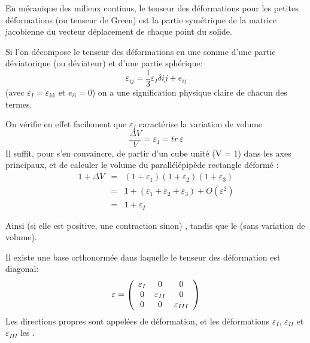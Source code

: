 \medskip
En mécanique des milieux continus, le tenseur des déformations pour les petites déformations 
(ou tenseur de Green) est la partie symétrique de la matrice jacobienne du vecteur déplacement 
de chaque point du solide.

\medskip
Si l'on décompose le tenseur des déformations en une somme d'une partie déviatorique
(ou déviateur) et d'une partie sphérique:
\begin{equation} \varepsilon_{ij}=\frac13\varepsilon_I\delta{ij}+e_{ij} \end{equation}
(avec $\varepsilon_I=\varepsilon_{kk}$ et $e_{ii}=0$)
on a une signification physique claire de chacun des termes.
 
On vérifie en effet facilement que $\varepsilon_I$ caractérise la variation de volume
\begin{equation} \frac{\Delta V}V=\varepsilon_I=tr~\varepsilon \end{equation}
 Il suffit, pour s'en convaincre, de partir d'un cube unité (V = 1) dans les axes principaux, et 
de calculer le volume du parallélépipède rectangle déformé :
\begin{equation}\begin{array}{rcl}
	1 + \Delta V &=& (1+\varepsilon_1) (1+\varepsilon_2) (1+\varepsilon_3)\\
		& =& 1+( \varepsilon_1+\varepsilon_2+\varepsilon_3)+O(\varepsilon^2) \\
		&=& 1+\varepsilon_I
\end{array}\end{equation}

Ainsi  
(si elle est positive, une contraction sinon) , 
tandis que le  (sans variation de volume).

\medskip
Il existe une base orthonormée dans laquelle le tenseur des déformation est diagonal:
\begin{equation} \varepsilon = \left( \begin{array}{ccc} \varepsilon_I &0&0\\ 0&\varepsilon_{II}&0\\ 0&0&\varepsilon_{III}\end{array}\right) \end{equation}
Les directions propres sont appelées  de déformation,
et les déformations $\varepsilon_I$, $\varepsilon_{II}$ et $\varepsilon_{III}$ les .

